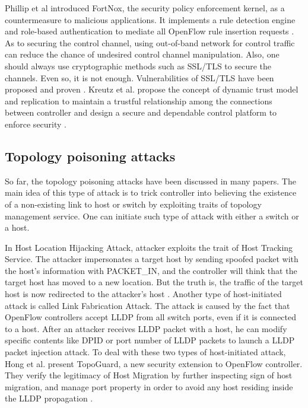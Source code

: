 Phillip et al introduced FortNox, the security policy enforcement kernel, as a countermeasure to malicious applications. It implements a rule detection engine and role-based authentication to mediate all OpenFlow rule insertion requests \cite{PSYFTG12}. As to securing the control channel, using out-of-band network for control traffic can reduce the chance of undesired control channel manipulation. Also, one should always use cryptographic methods such as SSL/TLS to secure the channels. Even so, it is not enough. Vulnerabilities of SSL/TLS have been proposed and proven \cite{HRKC12}. Kreutz et al. propose the concept of dynamic trust model and replication to maintain a trustful relationship among the connections between controller and design a secure and dependable control platform to enforce security \cite{KDFRV13}. 

\subsection{Topology poisoning attacks}
So far, the topology poisoning attacks have been discussed in many papers. The main idea of this type of attack is to trick controller into believing the existence of a non-existing link to host or switch by exploiting traits of topology management service. One can initiate such type of attack with either a switch or a host.

In Host Location Hijacking Attack, attacker exploits the trait of Host Tracking Service. The attacker impersonates a target host by sending spoofed packet with the host's information with PACKET\_IN, and the controller will think that the target host has moved to a new location. But the truth is, the traffic of the target host is now redirected to the attacker's host \cite{HXWG15}. Another type of host-initiated attack is called Link Fabrication Attack. The attack is caused by the fact that OpenFlow controllers accept LLDP from all switch ports, even if it is connected to a host. After an attacker receives LLDP packet with a host, he can modify specific contents like DPID or port number of LLDP packets to launch a LLDP packet injection attack. To deal with these two types of host-initiated attack, Hong et al. present TopoGuard, a new security extension to OpenFlow controller. They verify the legitimacy of Host Migration by further inspecting sign of host migration, and manage port property in order to avoid any host residing inside the LLDP propagation \cite{HXWG15}.

